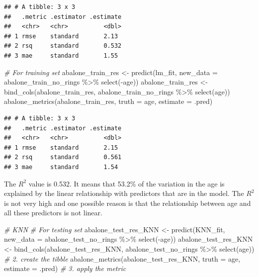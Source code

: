 \documentclass[
]{article}
\newenvironment{Shaded}{\begin{snugshade}}{\end{snugshade}}
\newcommand{\AttributeTok}[1]{\textcolor[rgb]{0.77,0.63,0.00}{#1}}
\newcommand{\CommentTok}[1]{\textcolor[rgb]{0.56,0.35,0.01}{\textit{#1}}}
\newcommand{\FunctionTok}[1]{\textcolor[rgb]{0.00,0.00,0.00}{#1}}
\newcommand{\NormalTok}[1]{#1}
\newcommand{\OtherTok}[1]{\textcolor[rgb]{0.56,0.35,0.01}{#1}}
\newcommand{\SpecialCharTok}[1]{\textcolor[rgb]{0.00,0.00,0.00}{#1}}
\begin{document}
\begin{verbatim}
## # A tibble: 3 x 3
##   .metric .estimator .estimate
##   <chr>   <chr>          <dbl>
## 1 rmse    standard       2.13 
## 2 rsq     standard       0.532
## 3 mae     standard       1.55
\end{verbatim}

\begin{Shaded}
\begin{Highlighting}[]
\CommentTok{\# For training set}
\NormalTok{abalone\_train\_res }\OtherTok{\textless{}{-}} \FunctionTok{predict}\NormalTok{(lm\_fit, }\AttributeTok{new\_data =}\NormalTok{ abalone\_train\_no\_rings }\SpecialCharTok{\%\textgreater{}\%} \FunctionTok{select}\NormalTok{(}\SpecialCharTok{{-}}\NormalTok{age))}
\NormalTok{abalone\_train\_res }\OtherTok{\textless{}{-}} \FunctionTok{bind\_cols}\NormalTok{(abalone\_train\_res, abalone\_train\_no\_rings }\SpecialCharTok{\%\textgreater{}\%} \FunctionTok{select}\NormalTok{(age))}
\FunctionTok{abalone\_metrics}\NormalTok{(abalone\_train\_res, }\AttributeTok{truth =}\NormalTok{ age, }\AttributeTok{estimate =}\NormalTok{ .pred)}
\end{Highlighting}
\end{Shaded}

\begin{verbatim}
## # A tibble: 3 x 3
##   .metric .estimator .estimate
##   <chr>   <chr>          <dbl>
## 1 rmse    standard       2.15 
## 2 rsq     standard       0.561
## 3 mae     standard       1.54
\end{verbatim}

The \(R^2\) value is 0.532. It means that 53.2\% of the variation in the
age is explained by the linear relationship with predictors that are in
the model. The \(R^2\) is not very high and one possible reason is that
the relationship between age and all these predictors is not linear.

\begin{Shaded}
\begin{Highlighting}[]
\CommentTok{\# KNN}
\CommentTok{\# For testing set}
\NormalTok{abalone\_test\_res\_KNN }\OtherTok{\textless{}{-}} \FunctionTok{predict}\NormalTok{(KNN\_fit, }\AttributeTok{new\_data =}\NormalTok{ abalone\_test\_no\_rings }\SpecialCharTok{\%\textgreater{}\%} \FunctionTok{select}\NormalTok{(}\SpecialCharTok{{-}}\NormalTok{age))}
\NormalTok{abalone\_test\_res\_KNN }\OtherTok{\textless{}{-}} \FunctionTok{bind\_cols}\NormalTok{(abalone\_test\_res\_KNN, abalone\_test\_no\_rings }\SpecialCharTok{\%\textgreater{}\%} \FunctionTok{select}\NormalTok{(age))  }
\CommentTok{\# 2. create the tibble}
\FunctionTok{abalone\_metrics}\NormalTok{(abalone\_test\_res\_KNN, }\AttributeTok{truth =}\NormalTok{ age, }\AttributeTok{estimate =}\NormalTok{ .pred)  }\CommentTok{\# 3. apply the metric}
\end{Highlighting}
\end{Shaded}
\end{document}
